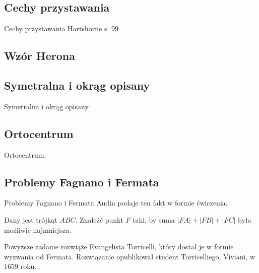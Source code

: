 

\subsection{Cechy przystawania}
Cechy przystawania
\loremipsum
Hartshorne s. 99







\subsection{Wzór Herona}


\subsection{Symetralna i okrąg opisany}
Symetralna i okrąg opisany
\loremipsum

\subsection{Ortocentrum}
Ortocentrum.
\loremipsum

\subsection{Problemy Fagnano i Fermata}
Problemy Fagnano i Fermata
Audin \cite[s. 101]{audin_2003} podaje ten fakt w formie ćwiczenia.

\begin{problem}
	Dany jest trójkąt $ABC$.
	Znaleźć punkt $F$ taki, by suma $|FA| + |FB| + |FC|$ była możliwie najmniejsza.
%
\end{problem}

Powyższe zadanie rozwiąże Evangelista Torricelli, który dostał je w formie wyzwania od Fermata.
%
Rozwiązanie opublikował student Torricelliego, Viviani, w 1659 roku.
. %

